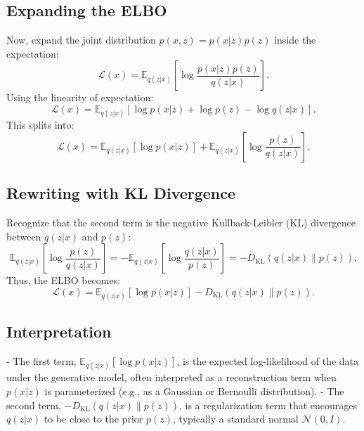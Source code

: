 \documentclass[12pt]{article}
\numberwithin{equation}{section}
\begin{document}
\subsection{Expanding the ELBO}
Now, expand the joint distribution \( p(x, z) = p(x | z) p(z) \) inside the expectation:
\begin{equation}
\mathcal{L}(x) = \mathbb{E}_{q(z | x)} \left[ \log \frac{p(x | z) p(z)}{q(z | x)} \right].
\end{equation}
Using the linearity of expectation:
\begin{equation}
\mathcal{L}(x) = \mathbb{E}_{q(z | x)} \left[ \log p(x | z) + \log p(z) - \log q(z | x) \right].
\end{equation}
This splits into:
\begin{equation}
\mathcal{L}(x) = \mathbb{E}_{q(z | x)} \left[ \log p(x | z) \right] + \mathbb{E}_{q(z | x)} \left[ \log \frac{p(z)}{q(z | x)} \right].
\label{eq:elbo_split}
\end{equation}

\subsection{Rewriting with KL Divergence}
Recognize that the second term is the negative Kullback-Leibler (KL) divergence between \( q(z | x) \) and \( p(z) \):
\[
\mathbb{E}_{q(z | x)} \left[ \log \frac{p(z)}{q(z | x)} \right] = - \mathbb{E}_{q(z | x)} \left[ \log \frac{q(z | x)}{p(z)} \right] = - D_{\text{KL}}(q(z | x) \| p(z)).
\]
Thus, the ELBO becomes:
\begin{equation}
\mathcal{L}(x) = \mathbb{E}_{q(z | x)} \left[ \log p(x | z) \right] - D_{\text{KL}}(q(z | x) \| p(z)).
\label{eq:elbo_kl}
\end{equation}

\subsection{Interpretation}
- The first term, \( \mathbb{E}_{q(z | x)} \left[ \log p(x | z) \right] \), is the expected log-likelihood of the data under the generative model, often interpreted as a reconstruction term when \( p(x | z) \) is parameterized (e.g., as a Gaussian or Bernoulli distribution).
- The second term, \( - D_{\text{KL}}(q(z | x) \| p(z)) \), is a regularization term that encourages \( q(z | x) \) to be close to the prior \( p(z) \), typically a standard normal \( \mathcal{N}(0, I) \).
\end{document}
